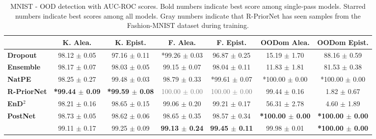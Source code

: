 \begin{table*}[ht]
    \centering
    \caption{MNIST - OOD detection with AUC-ROC scores. Bold numbers indicate best score among single-pass models. Starred numbers indicate best scores among all models. Gray numbers indicate that R-PriorNet has seen samples from the Fashion-MNIST dataset during training.}
    \label{tab:auroc-mnist}
    \scriptsize
    \begin{tabular}{lcccccc}
        \toprule
        & \textbf{K. Alea.} & \textbf{K. Epist.} & \textbf{F. Alea.} & \textbf{F. Epist.} & \textbf{OODom Alea.} & \textbf{OODom Epist.} \\
        \midrule
        \textbf{Dropout} & 98.12 $\pm$ 0.05 & 97.16 $\pm$ 0.11 & *99.26 $\pm$ 0.03 & 96.87 $\pm$ 0.25 & 15.19 $\pm$ 1.70 & 88.16 $\pm$ 0.59 \\
        \textbf{Ensemble} & 98.17 $\pm$ 0.07 & 98.03 $\pm$ 0.05 & 99.15 $\pm$ 0.07 & 98.04 $\pm$ 0.11 & 11.83 $\pm$ 1.81 & 81.53 $\pm$ 0.38 \\
        \textbf{NatPE} & 98.25 $\pm$ 0.27 & 99.48 $\pm$ 0.03 & 98.79 $\pm$ 0.33 & *99.61 $\pm$ 0.07 & *100.00 $\pm$ 0.00 & *100.00 $\pm$ 0.00 \\
        \midrule
        \textbf{R-PriorNet} & \textbf{*99.44 $\pm$ 0.09} & \textbf{*99.59 $\pm$ 0.08} & \textcolor{gray}{100.00 $\pm$ 0.00} & \textcolor{gray}{100.00 $\pm$ 0.00} & 99.44 $\pm$ 0.16 & 1.82 $\pm$ 0.67 \\
        \textbf{EnD$^2$} & 98.21 $\pm$ 0.16 & 98.65 $\pm$ 0.15 & 99.06 $\pm$ 0.20 & 99.21 $\pm$ 0.17 & 56.31 $\pm$ 2.78 & 4.60 $\pm$ 1.89 \\
        \textbf{PostNet} & 98.73 $\pm$ 0.05 & 98.62 $\pm$ 0.06 & 98.65 $\pm$ 0.35 & 98.57 $\pm$ 0.34 & \textbf{*100.00 $\pm$ 0.00} & \textbf{*100.00 $\pm$ 0.00} \\
        \textbf{\NatPNacro{}} & 99.11 $\pm$ 0.17 & 99.25 $\pm$ 0.09 & \textbf{99.13 $\pm$ 0.24} & \textbf{99.45 $\pm$ 0.11} & 99.98 $\pm$ 0.01 & \textbf{*100.00 $\pm$ 0.00} \\
        \bottomrule
    \end{tabular}
\end{table*}

